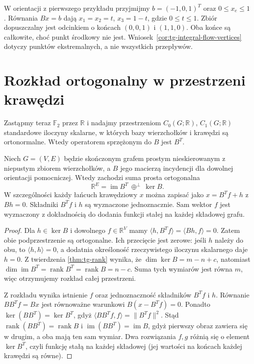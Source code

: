 \begin{przyklad}
W orientacji z pierwszego przykładu przyjmijmy
$b=(-1,0,1)^T$ oraz $0\le x_e\le1$.
Równania $Bx=b$ dają $x_1=x_2=t$, $x_3=1-t$,
gdzie $0\le t\le1$. Zbiór dopuszczalny jest odcinkiem
o końcach $(0,0,1)$ i $(1,1,0)$.
Oba końce są całkowite, choć punkt środkowy nie jest.
Wniosek~\ref{cor:tg-integral-flow-vertices} dotyczy
punktów ekstremalnych, a nie wszystkich przepływów.
\end{przyklad}

\newpage
\section{Rozkład ortogonalny w przestrzeni krawędzi}
\label{sec:tg-linear-hodge}

Zastąpmy teraz $\mathbb F_2$ przez $\mathbb R$ i nadajmy
przestrzeniom $C_0(G;\mathbb R)$, $C_1(G;\mathbb R)$
standardowe iloczyny skalarne, w których bazy wierzchołków
i krawędzi są ortonormalne. Wtedy operatorem sprzężonym
do $B$ jest $B^T$.

\begin{twierdzenie}
\label{thm:tg-edge-hodge}
Niech $G=(V,E)$ będzie skończonym grafem prostym nieskierowanym
z niepustym zbiorem wierzchołków, a $B$ jego macierzą incydencji
dla dowolnej orientacji pomocniczej. Wtedy zachodzi suma prosta ortogonalna
\[
\mathbb R^E=\operatorname{im}B^T\ \oplus^\perp\ \ker B.
\]
W szczególności każdy łańcuch krawędziowy $x$ można
zapisać jako $x=B^Tf+h$ z $Bh=0$.
Składniki $B^Tf$ i $h$ są wyznaczone jednoznacznie.
Sam wektor $f$ jest wyznaczony z dokładnością do dodania funkcji
stałej na każdej składowej grafu.
\end{twierdzenie}

\begin{proof}
Dla $h\in\ker B$ i dowolnego $f\in\mathbb R^V$ mamy
$\langle h,B^Tf\rangle=\langle Bh,f\rangle=0$.
Zatem obie podprzestrzenie są ortogonalne.
Ich przecięcie jest zerowe: jeśli $h$ należy do obu,
to $\langle h,h\rangle=0$, a dodatnia określoność
rzeczywistego iloczynu skalarnego daje $h=0$.
Z twierdzenia \ref{thm:tg-rank} wynika, że
$\dim\ker B=m-n+c$, natomiast
$\dim\operatorname{im}B^T=\operatorname{rank}B^T
=\operatorname{rank}B=n-c$.
Suma tych wymiarów jest równa $m$,
więc otrzymujemy rozkład całej przestrzeni.

Z rozkładu wynika istnienie $f$ oraz jednoznaczność
składników $B^Tf$ i $h$. Równanie $BB^Tf=Bx$
jest równoważne warunkowi $B(x-B^Tf)=0$.
Ponadto $\ker(BB^T)=\ker B^T$, gdyż
$\langle BB^Tf,f\rangle=\|B^Tf\|^2$.
Stąd $\operatorname{rank}(BB^T)=\operatorname{rank}B$
i $\operatorname{im}(BB^T)=\operatorname{im}B$,
gdyż pierwszy obraz zawiera się w drugim, a oba mają
ten sam wymiar.
Dwa rozwiązania $f,g$ różnią się o element $\ker B^T$,
czyli funkcję stałą na każdej składowej (jej wartości
na końcach każdej krawędzi są równe).
\end{proof}

